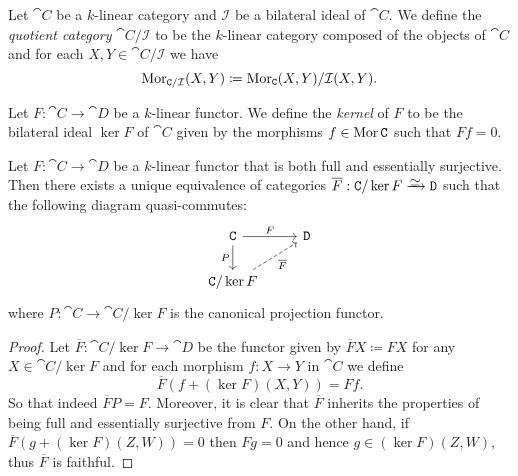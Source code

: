 \begin{definition}
    \label{def:k-linear-cat-quotient-category}
    Let \(\cat C\) be a \(k\)-linear category and \(\mathcal{I}\) be a bilateral ideal of
    \(\cat C\). We define the \emph{quotient category} \(\cat C/\mathcal{I}\) to be the
    \(k\)-linear category composed of the objects of \(\cat C\) and for each
    \(X, Y \in \cat C/\mathcal{I}\) we have
    \[
        \operatorname{Mor}_{\texttt C/\mathcal{I}}(X, Y) \coloneq \operatorname{Mor}_{\texttt C}(X, Y)/\mathcal{I}(X, Y).
    \]
\end{definition}

\begin{definition}
    \label{def:k-linear-functor-kernel}
    Let \(F: \cat C \to \cat D\) be a \(k\)-linear functor. We define the
    \emph{kernel} of \(F\) to be the bilateral ideal \(\ker F\) of \(\cat C\) given
    by the morphisms \(f \in \operatorname{Mor} \texttt C\) such that \(F f = 0\).
\end{definition}

\begin{proposition}
    \label{prop:k-linear-functor-quotient-kernel-equivalence--cats}
    Let \(F: \cat C \to \cat D\) be a \(k\)-linear functor that is both full and
    essentially surjective. Then there exists a unique equivalence of categories
    \(\overline F: \cat C/\ker F \isoto \cat D\) such that the following diagram
    quasi-commutes:
    \[
        \begin{tikzcd}
            \cat C \ar[d, "P"'] \ar[r, "F"]               &\cat D \\
            \cat C/\ker F \ar[ru, "\overline F"', dashed] &
        \end{tikzcd}
    \]
    where \(P: \cat C \to \cat C/\ker F\) is the canonical projection functor.
\end{proposition}

\begin{proof}
    Let \(\overline F: \cat C/\ker F \to \cat D\) be the functor given by
    \(\overline F X \coloneq F X\) for any \(X \in \cat C/\ker F\) and for each morphism
    \(f: X \to Y\) in \(\cat C\) we define
    \[
        \overline F (f + (\ker F)(X, Y)) = F f.
    \]
    So that indeed \(\overline F P = F\). Moreover, it is clear that \(\overline F\)
    inherits the properties of being full and essentially surjective from \(F\). On
    the other hand, if \(\overline F (g + (\ker F)(Z, W)) = 0\) then \(F g = 0\) and
    hence \(g \in (\ker F)(Z, W)\), thus \(\overline F\) is faithful.
\end{proof}

